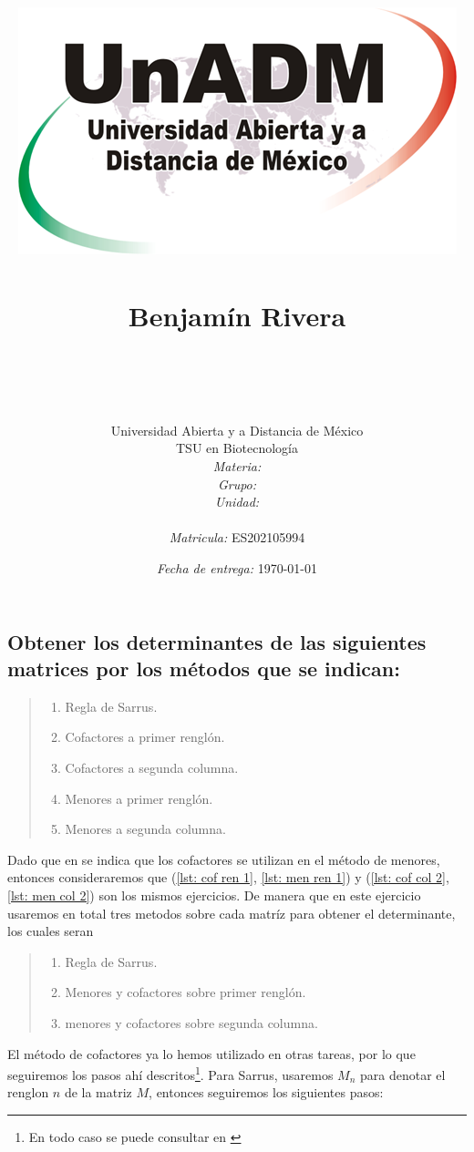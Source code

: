 \documentclass[12pt]{article}
\title{
	\includegraphics{../../../assets/logo-unadm} \\
	\ \\ Benjam\'in Rivera \\
	\bf{\titulo}\\\ \\}
\author{
	Universidad Abierta y a Distancia de México \\
	TSU en Biotecnolog\'ia \\
	\textit{Materia:} \materia \\
	\textit{Grupo:} \grupo \\
	\textit{Unidad:} \unidad \\
	\\
	\textit{Matricula:} ES202105994 }
\date{\textit{Fecha de entrega:} \today}
\begin{document}
\maketitle\newpage

\subsection*{Obtener los determinantes de las siguientes matrices por los métodos que se indican:}

	\begin{quote}\begin{enumerate}[1.]
		\item Regla de Sarrus.
		\item Cofactores a primer rengl\'on.	\label{lst: cof ren 1}
		\item Cofactores a segunda columna.	\label{lst: cof col 2}
		\item Menores a primer rengl\'on.		\label{lst: men ren 1}
		\item Menores a segunda columna.		\label{lst: men col 2}
	\end{enumerate}\end{quote}

	\par Dado que en \cite[p\'ag. 10]{basica} se indica que los cofactores se utilizan en el m\'etodo de menores, entonces consideraremos que (\ref{lst: cof ren 1}, \ref{lst: men ren 1}) y (\ref{lst: cof col 2}, \ref{lst: men col 2}) son los mismos ejercicios. De manera que en este ejercicio usaremos en total tres metodos sobre cada matr\'iz para obtener el determinante, los cuales seran
	
	\begin{quote}\begin{enumerate}[1.]
		\item Regla de Sarrus.	
		\item Menores y cofactores sobre primer rengl\'on.	
		\item menores y cofactores sobre segunda columna.		
	\end{enumerate}\end{quote}
	
	\par El m\'etodo de cofactores ya lo hemos utilizado en otras tareas, por lo que seguiremos los pasos ah\'i descritos\footnote{En todo caso se puede consultar en \cite[p\'ag. 10 y 11]{basica}}. Para Sarrus, usaremos $M_n$ para denotar el renglon $n$ de la matriz $M$, entonces seguiremos los siguientes pasos:
	
\end{document}
